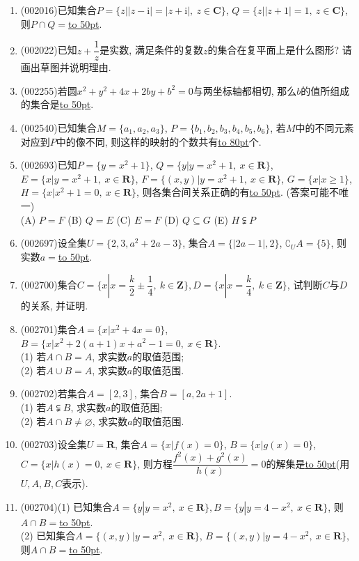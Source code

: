 \documentclass[10pt,a4paper]{article}
\newcommand{\blank}[1]{\underline{\hbox to #1pt{}}}
\begin{document}
\begin{enumerate}[1.]
整数集$\mathbf{Z}$和自然数集$\mathbf{N}$的关系为\blank{100}.
\item {\tiny (002016)}已知集合$P=\{z||z-\mathrm{i}|=|z+\mathrm{i}|, \ z\in \mathbf{C}\}$, $Q=\{z||z+1|=1, \ z\in \mathbf{C}\}$, 则$P\cap Q=$\blank{50}.
\item {\tiny (002022)}已知$z+\dfrac{1}{z}$是实数, 满足条件的复数$z$的集合在复平面上是什么图形? 请画出草图并说明理由.
\item {\tiny (002255)}若圆$x^2+y^2+4x+2by+b^2=0$与两坐标轴都相切, 那么$b$的值所组成的集合是\blank{50}.
\item {\tiny (002540)}已知集合$M=\{a_1,a_2,a_3\}$, $P=\{b_1,b_2,b_3,b_4,b_5,b_6\}$, 若$M$中的不同元素对应到$P$中的像不同, 则这样的映射的个数共有\blank{80}个.
\item {\tiny (002693)}已知$P=\{y=x^2+1\}$, $Q=\{y|y=x^2+1, \ x\in \mathbf{R}\}$, $E=\{x|y=x^2+1, \  x\in \mathbf{R}\}$, $F=\{(x,y)|y=x^2+1, \ x\in \mathbf{R}\}$, $G=\{x|x\ge 1\}$, $H=\{x|x^2+1=0, \ x\in \mathbf{R}\}$, 则各集合间关系正确的有\blank{50}. (答案可能不唯一)\\
(A) $P=F$   (B) $Q=E$   (C) $E=F$   (D) $Q\subseteq G$  (E) $H\subsetneqq P$
\item {\tiny (002697)}设全集$U=\{2,3,a^2+2a-3\}$, 集合$A=\{|2a-1|,2\}$, $\complement_U A=\{5\}$, 则实数$a=$\blank{50}.
\item {\tiny (002700)}集合$C=\{x|x=\dfrac k2\pm \dfrac14, \ k\in \mathbf{Z}\},D=\{x|x=\dfrac k4,\ k\in \mathbf{Z}\}$, 试判断$C$与$D$的关系, 并证明.
\item {\tiny (002701)}集合$A=\{x|x^2+4x=0\}$, $B=\{x|x^2+2(a+1)x+a^2-1=0,\ x\in \mathbf{R}\}$.\\
(1) 若$A\cap B=A$, 求实数$a$的取值范围;\\
(2) 若$A\cup B=A$, 求实数$a$的取值范围.
\item {\tiny (002702)}若集合$A=[2,3]$, 集合$B=[a,2a+1]$.\\
(1) 若$A\subsetneqq B$, 求实数$a$的取值范围;\\
(2) 若$A\cap B\ne \varnothing$, 求实数$a$的取值范围.
\item {\tiny (002703)}设全集$U=\mathbf{R}$, 集合$A=\{x|f(x)=0\}$, $B=\{x|g(x)=0\}$, $C=\{x|h(x)=0, \ x\in \mathbf{R}\}$, 则方程$\dfrac{f^2(x)+g^2(x)}{h(x)}=0$的解集是\blank{50}(用$U,A,B,C$表示).
\item {\tiny (002704)}(1) 已知集合$A=\{y|y=x^2, \ x\in \mathbf{R}\}, B=\{y|y=4-x^2, \ x\in \mathbf{R}\}$, 则$A\cap B=$\blank{50}.\\
(2) 已知集合$A=\{(x,y)|y={x^2},\ x\in \mathbf{R}\}$, $B=\{(x,y)|y=4-x^2, \ x\in \mathbf{R}\}$, 则$A\cap B=$\blank{50}.

\end{enumerate}
\end{document}
